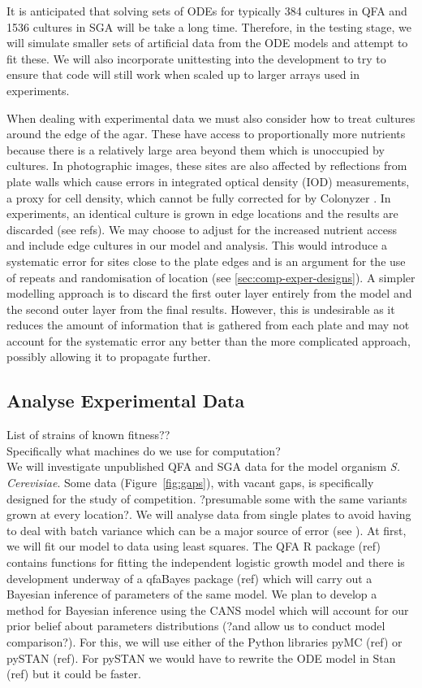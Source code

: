 It is anticipated that solving sets of ODEs for typically 384 cultures
in QFA and 1536 cultures in SGA will be take a long time. Therefore,
in the testing stage, we will simulate smaller sets of artificial data
from the ODE models and attempt to fit these. We will also incorporate
unittesting into the development to try to ensure that code will
still work when scaled up to larger arrays used in experiments.

When dealing with experimental data we must also consider how to treat
cultures around the edge of the agar. These have access to
proportionally more nutrients because there is a relatively large area
beyond them which is unoccupied by cultures. In photographic images,
these sites are also affected by reflections from plate walls which
cause errors in integrated optical density (IOD) measurements, a proxy
for cell density, which cannot be fully corrected for by Colonyzer
\citep{Lawless2010}. In experiments, an identical culture is grown in
edge locations and the results are discarded (see refs). We may choose
to adjust for the increased nutrient access and include edge cultures
in our model and analysis. This would introduce a systematic error for
sites close to the plate edges and is an argument for the use of
repeats and randomisation of location (see
\ref{sec:comp-exper-designs}). A simpler modelling approach is to
discard the first outer layer entirely from the model and the second
outer layer from the final results. However, this is undesirable as it
reduces the amount of information that is gathered from each plate and
may not account for the systematic error any better than the more
complicated approach, possibly allowing it to propagate further.

\subsection{Analyse Experimental Data}
\label{sec:analyse-data}

List of strains of known fitness??\\
Specifically what machines do we use for computation?\\

We will investigate unpublished QFA and SGA data for the model
organism \textit{S. Cerevisiae}. Some data (Figure~\ref{fig:gaps}),
with vacant gaps, is specifically designed for the study of
competition. ?presumable some with the same variants grown at every
location?. We will analyse data from single plates to avoid having to
deal with batch variance which can be a major source of error (see
\citet{Baryshnikova2010}). At first, we will fit our model to data
using least squares. The QFA R package (ref) contains functions for
fitting the independent logistic growth model and there is development
underway of a qfaBayes package (ref) which will carry out a Bayesian
inference of parameters of the same model. We plan to develop a method
for Bayesian inference using the CANS model which will account for our
prior belief about parameters distributions (?and allow us to conduct
model comparison?). For this, we will use either of the Python
libraries pyMC (ref) or pySTAN (ref). For pySTAN we would have to
rewrite the ODE model in Stan (ref) but it could be faster.

